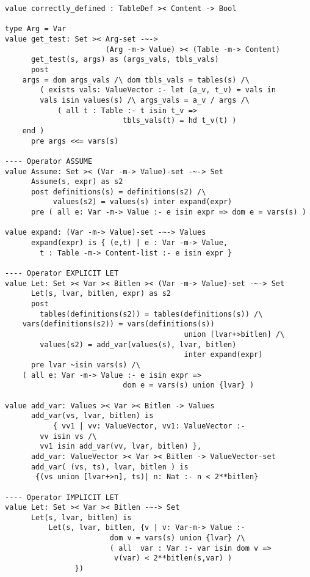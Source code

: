 {\begin{lstlisting}
value correctly_defined : TableDef >< Content -> Bool

type Arg = Var
value get_test: Set >< Arg-set -~->
                       (Arg -m-> Value) >< (Table -m-> Content)
      get_test(s, args) as (args_vals, tbls_vals)
      post
	args = dom args_vals /\ dom tbls_vals = tables(s) /\
        ( exists vals: ValueVector :- let (a_v, t_v) = vals in
	    vals isin values(s) /\ args_vals = a_v / args /\
            ( all t : Table :- t isin t_v =>
                           tbls_vals(t) = hd t_v(t) )
	end )
      pre args <<= vars(s)

---- Operator ASSUME
value Assume: Set >< (Var -m-> Value)-set -~-> Set
      Assume(s, expr) as s2
      post definitions(s) = definitions(s2) /\
           values(s2) = values(s) inter expand(expr)
      pre ( all e: Var -m-> Value :- e isin expr => dom e = vars(s) )

value expand: (Var -m-> Value)-set -~-> Values
      expand(expr) is { (e,t) |	e : Var -m-> Value,
		t : Table -m-> Content-list :- e isin expr }

---- Operator EXPLICIT LET
value Let: Set >< Var >< Bitlen >< (Var -m-> Value)-set -~-> Set
      Let(s, lvar, bitlen, expr) as s2
      post
        tables(definitions(s2)) = tables(definitions(s)) /\
	vars(definitions(s2)) = vars(definitions(s))
                                         union [lvar+>bitlen] /\
        values(s2) = add_var(values(s), lvar, bitlen)
                                         inter expand(expr)
      pre lvar ~isin vars(s) /\
	( all e: Var -m-> Value :- e isin expr =>
                           dom e = vars(s) union {lvar} )

value add_var: Values >< Var >< Bitlen -> Values
      add_var(vs, lvar, bitlen) is
           { vv1 | vv: ValueVector, vv1: ValueVector :-
		vv isin vs /\
		vv1 isin add_var(vv, lvar, bitlen) },
      add_var: ValueVector >< Var >< Bitlen -> ValueVector-set
      add_var( (vs, ts), lvar, bitlen ) is
	   {(vs union [lvar+>n], ts)| n: Nat :- n < 2**bitlen}

---- Operator IMPLICIT LET
value Let: Set >< Var >< Bitlen -~-> Set
      Let(s, lvar, bitlen) is
          Let(s, lvar, bitlen, {v | v: Var-m-> Value :-
                        dom v = vars(s) union {lvar} /\
                        ( all  var : Var :- var isin dom v =>
                         v(var) < 2**bitlen(s,var) )
				})



\end{lstlisting}}
